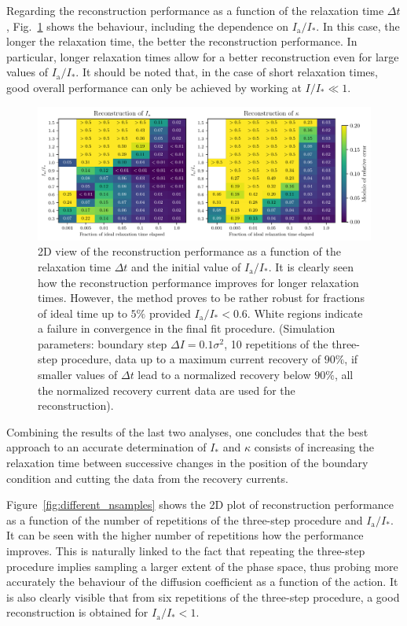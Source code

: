 {Regarding the reconstruction performance as a function of the relaxation time $\Delta t$, Fig.~\ref{fig:different_time} shows the behaviour, including the dependence on $I_\mathrm{a}/I_\ast$. In this case, the longer the relaxation time, the better the reconstruction performance. In particular, longer relaxation times allow for a better reconstruction even for large values of $I_\mathrm{a}/I_\ast$. It should be noted that, in the case of short relaxation times, good overall performance can only be achieved by working at $I/I_\ast \ll 1$.
%
\begin{figure}[htp]
    \centering
    \includegraphics[width=\textwidth]{4_probing_the_diffusive_behavior/figs/final/MULTI_different_time.pdf}
    \caption{2D view of the reconstruction performance as a function of the relaxation time $\Delta t$ and the initial value of $I_\mathrm{a}/I_\ast$. It is clearly seen how the reconstruction performance improves for longer relaxation times. However, the method proves to be rather robust for fractions of ideal time up to $5\%$ provided $I_\mathrm{a}/I_\ast < 0.6$. White regions indicate a failure in convergence in the final fit procedure. (Simulation parameters: boundary step $\Delta I=0.1 \sigma^2$, 10 repetitions of the three-step procedure, data up to a maximum current recovery of $90\%$, if smaller values of $\Delta t$ lead to a normalized recovery below $90\%$, all the normalized recovery current data are used for the reconstruction).}
    \label{fig:different_time}
\end{figure}
%
Combining the results of the last two analyses, one concludes that the best approach to an accurate determination of $I_\ast$ and $\kappa$ consists of increasing the relaxation time between successive changes in the position of the boundary condition and cutting the data from the recovery currents. 

Figure~\ref{fig:different_nsamples} shows the 2D plot of reconstruction performance as a function of the number of repetitions of the three-step procedure and $I_\mathrm{a}/I_\ast$. It can be seen with the higher number of repetitions how the performance improves. This is naturally linked to the fact that repeating the three-step procedure implies sampling a larger extent of the phase space, thus probing more accurately the behaviour of the diffusion coefficient as a function of the action. It is also clearly visible that from six repetitions of the three-step procedure, a good reconstruction is obtained for $I_\mathrm{a}/I_\ast < 1$.

}
